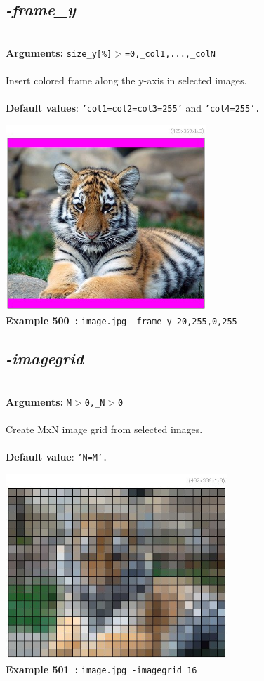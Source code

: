 \documentclass[a4paper,11pt,twoside]{book}
\begin{document}
\subsection{\emph{-frame\_y} }\vspace*{-0.5em}
~\\\textbf{Arguments: } 
{\small \texttt{size\_y[\%]$>$=0,\_col1,...,\_colN}}\\~\\
Insert colored frame along the y-axis in selected images.
~\\~\\\textbf{Default values}: {\small \texttt{'col1=col2=col3=255'} and \texttt{'col4=255'.}}
\begin{center}\includegraphics[keepaspectratio=true,height=7cm,width=\textwidth]{img/gmic_def500.jpg}\\
{\footnotesize \textbf{Example 500~:} \texttt{image.jpg -frame\_y 20,255,0,255}}
\end{center}

\subsection{\emph{-imagegrid} }\vspace*{-0.5em}
~\\\textbf{Arguments: } 
{\small \texttt{M$>$0,\_N$>$0}}\\~\\
Create MxN image grid from selected images.
~\\~\\\textbf{Default value}: {\small \texttt{'N=M'.}}
\begin{center}\includegraphics[keepaspectratio=true,height=7cm,width=\textwidth]{img/gmic_def501.jpg}\\
{\footnotesize \textbf{Example 501~:} \texttt{image.jpg -imagegrid 16}}
\end{center}
\end{document}
